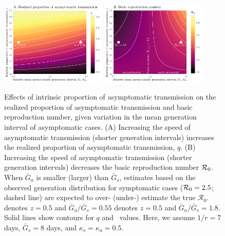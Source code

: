 \begin{figure}[b!]
\begin{center}
\includegraphics[width=0.45\textwidth]{figheatmap.pdf}
\mbox{\hspace{0.05\textwidth}}
\includegraphics[width=0.45\textwidth]{figheatmap_R0.pdf}
\caption{Effects of intrinsic proportion of asymptomatic transmission on the realized proportion of asymptomatic transmission and basic reproduction number, given variation in
the mean generation interval of asymptomatic cases. 
(A) Increasing the speed of asymptomatic transmission (shorter generation intervals) increases the realized proportion of asymptomatic transmission, $q$.
(B) Increasing the speed of asymptomatic transmission (shorter generation intervals) decreases the basic reproduction number ${\cal{R}}_0$.
When $\bar G_a$ is smaller (larger) than $\bar G_s$, estimates based on the observed generation distribution for symptomatic cases (${\cal{R}}_0=2.5$; dashed line) are expected to over- (under-) estimate the true $\mathcal R_0$.
\DIFdelbeginFL {}\DIFdelendFL \DIFaddbeginFL {}\DIFaddendFL denotes $z=0.5$ and $\bar G_a/\bar G_s = 0.55$ \DIFdelbeginFL {}\DIFdelendFL \DIFaddbeginFL {}\DIFaddendFL denotes $z=0.5$ and $\bar G_a/\bar G_s = 1.8$.
Solid lines show contours for $q$ and \Ro\ values. 
\DIFaddbeginFL {}\DIFaddendFL Here, we assume $1/r=7$ days, $\bar G_s=8$ days, and $\kappa_s=\kappa_a=0.5$.
\label{fig.importance}}
\end{center}
\end{figure}

